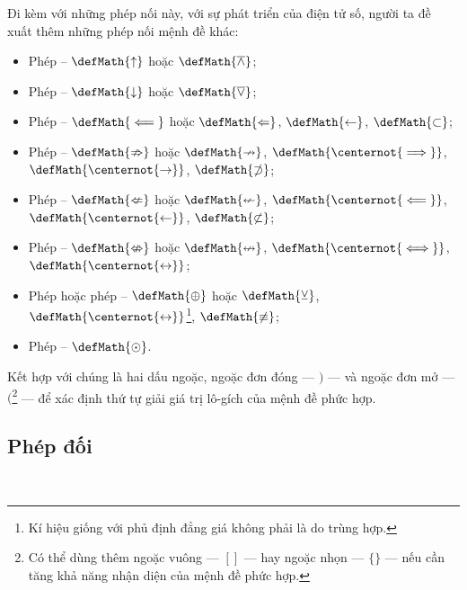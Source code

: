 Đi kèm với những phép nối này, với sự phát triển của điện tử số, người ta đề xuất thêm những phép nối mệnh đề khác:
\begin{itemize}
   \item Phép  -- $\defMath{\uparrow}$ hoặc $\defMath{\overline{\land}}$;
   \item Phép  -- $\defMath{\downarrow}$ hoặc $\defMath{\overline{\lor}}$; 
   \item Phép  -- $\defMath{\impliedby}$ hoặc $\defMath{\Leftarrow}$, $\defMath{\leftarrow}$, $\defMath{\subset}$;
   \item Phép  -- $\defMath{\nRightarrow}$ hoặc $\defMath{\nrightarrow}$, $\defMath{\centernot{\implies}}$, $\defMath{\centernot{\rightarrow}}$, $\defMath{\not\supset}$;
   \item Phép  -- $\defMath{\nLeftarrow}$ hoặc $\defMath{\nleftarrow}$, $\defMath{\centernot{\impliedby}}$, $\defMath{\centernot{\leftarrow}}$, $\defMath{\not\subset}$;
   \item Phép  -- $\defMath{\nLeftrightarrow}$ hoặc $\defMath{\nleftrightarrow}$, $\defMath{\centernot{\iff}}$, $\defMath{\centernot{\leftrightarrow}}$; 
   \item Phép  hoặc phép  -- $\defMath{\oplus}$ hoặc $\defMath{\veebar}$, $\defMath{\centernot{\leftrightarrow}}$\footnote{Kí hiệu giống với phủ định đẳng giá không phải là do trùng hợp.}, $\defMath{\not\equiv}$;
   \item Phép  -- $\defMath{\odot}$.
\end{itemize}

Kết hợp với chúng là hai dấu ngoặc, ngoặc đơn đóng --- $)$ --- và ngoặc đơn mở --- $($\footnote{Có thể dùng thêm ngoặc vuông --- $[]$ --- hay ngoặc nhọn --- $\{\}$ --- nếu cần tăng khả năng nhận diện của mệnh đề phức hợp.} --- để xác định thứ tự giải giá trị lô-gích của mệnh đề phức hợp.

\subsection{Phép đối}

\ %

